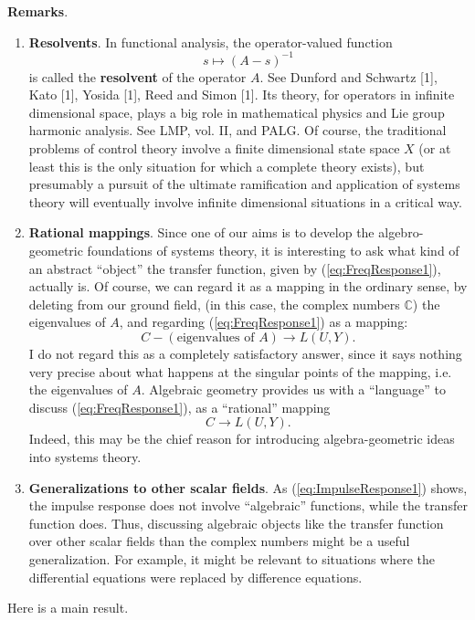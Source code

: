 \documentclass[12pt]{book}
\theoremstyle{plain}
\theoremstyle{definition}
\begin{document}
\textbf{Remarks}.
\begin{enumerate}
    \item \textbf{Resolvents}.
    In functional analysis, the operator-valued function
    $$s \mapsto (A-s)^{-1}$$
    is called the \textbf{resolvent} of the operator $A$.
    See Dunford and Schwartz [1], Kato [1], Yosida [1], Reed and Simon [1]. %
    Its theory, for operators in infinite dimensional space, plays a big role in mathematical physics and Lie group harmonic analysis.
    See LMP, vol. II, and PALG.
    Of course, the traditional problems of control theory involve a finite dimensional state space $X$ (or at least this is the only situation for which a complete theory exists), but presumably a pursuit of the ultimate ramification and application of systems theory will eventually involve infinite dimensional situations in a critical way.
    \item \textbf{Rational mappings}.
    Since one of our aims is to develop the algebro-geometric foundations of systems theory, it is interesting to ask what kind of an abstract ``object'' the transfer function, given by (\ref{eq:FreqResponse1}), actually is.
    Of course, we can regard it as a mapping in the ordinary sense, by deleting from our ground field, (in this case, the complex numbers $\mathbb{C}$) the eigenvalues of $A$, and regarding (\ref{eq:FreqResponse1}) as a mapping:
    $$C - (\text{eigenvalues of } A) \to L(U, Y).$$
    I do not regard this as a completely satisfactory answer, since it says nothing very precise about what happens at the singular points of the mapping, i.e. the eigenvalues of $A$.
    Algebraic geometry provides us with a ``language'' to discuss (\ref{eq:FreqResponse1}), as a ``rational'' mapping
    $$C \to L(U, Y).$$
    Indeed, this may be the chief reason for introducing algebra-geometric ideas into systems theory.
    \item \textbf{Generalizations to other scalar fields}.
    As (\ref{eq:ImpulseResponse1}) shows, the impulse response does not involve ``algebraic'' functions, while the transfer function does.
    Thus, discussing algebraic objects like the transfer function over other scalar fields than the complex numbers might be a useful generalization.
    For example, it might be relevant to situations where the differential equations were replaced by difference equations.
\end{enumerate}

Here is a main result.
\end{document}

